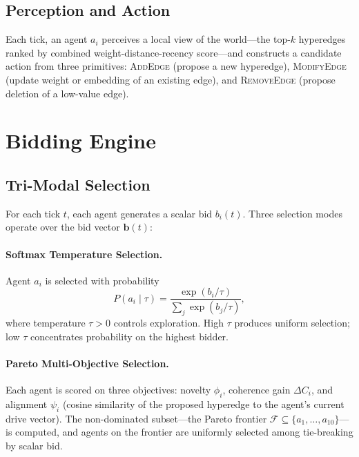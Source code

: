\documentclass[11pt]{article}
\begin{document}
\subsection{Perception and Action}

Each tick, an agent $a_i$ perceives a local view of the world---the top-$k$
hyperedges ranked by combined weight-distance-recency score---and constructs a
candidate action from three primitives: \textsc{AddEdge} (propose a new
hyperedge), \textsc{ModifyEdge} (update weight or embedding of an existing edge),
and \textsc{RemoveEdge} (propose deletion of a low-value edge).

\section{Bidding Engine}
\nopagebreak[4]
\label{sec:bidding}

\subsection{Tri-Modal Selection}

For each tick $t$, each agent generates a scalar bid $b_i(t)$. Three selection
modes operate over the bid vector $\mathbf{b}(t)$:

\paragraph{Softmax Temperature Selection.}
Agent $a_i$ is selected with probability
\begin{equation}
  P(a_i \mid \tau) = \frac{\exp(b_i / \tau)}{\sum_j \exp(b_j / \tau)},
  \label{eq:softmax}
\end{equation}
where temperature $\tau > 0$ controls exploration. High $\tau$ produces uniform
selection; low $\tau$ concentrates probability on the highest bidder.

\paragraph{Pareto Multi-Objective Selection.}
Each agent is scored on three objectives: novelty $\phi_i$, coherence gain
$\Delta C_i$, and alignment $\psi_i$ (cosine similarity of the proposed
hyperedge to the agent's current drive vector). The non-dominated subset---the
Pareto frontier $\mathcal{F} \subseteq \{a_1,\ldots,a_{10}\}$---is computed,
and agents on the frontier are uniformly selected among tie-breaking by
scalar bid.
\end{document}
